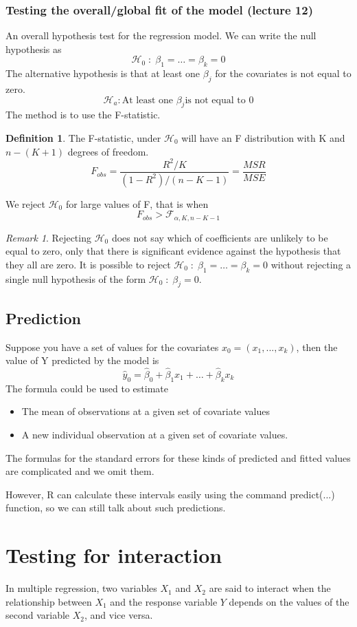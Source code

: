 \documentclass[12pt]{article}
\theoremstyle{definition}
\newtheorem{definition}{Definition}[section]
\theoremstyle{remark}
\newtheorem*{remark}{Remark}
\begin{document}
\subsubsection{Testing the overall/global fit of the model (lecture 12)}
    An overall hypothesis test for the regression model.
    We can write the null hypothesis as $$\mathcal{H}_0 \;:\; \beta_1 =\hdots=\beta_k =0$$
    The alternative hypothesis is that at least one $\beta_j$ for the covariates is not
    equal to zero.
    $$\mathcal{H}_a : \text{At least one } \beta_j \text{is not equal to }0$$
    The method is to use the F-statistic. 
    \begin{definition}
        The F-statistic, under $\mathcal{H}_0$ will have an F distribution with K and $n-(K + 1)$ degrees of freedom.
            $$F_{obs} = \frac{R^2/K}{(1-R^2)/(n-K-1)} = \frac{MSR}{MSE}$$
    \end{definition}
    We reject $\mathcal{H}_0$ for large values of F, that is when 
    $$F_{obs}>\mathcal{F}_{\alpha, K, n-K-1}$$
    \begin{remark}
        Rejecting $\mathcal{H}_0$ does not say which of coefficients are unlikely to be equal to zero, only that there is significant evidence against the hypothesis that they all are zero.
        It is possible to reject $\mathcal{H}_0 \; : \;\beta_1 =\hdots = \beta_k= 0$ without rejecting a single null hypothesis of the form $\mathcal{H}_0 \; :\; \beta_j = 0$.
    \end{remark}
\subsection{Prediction}
    Suppose you have a set of values for the covariates $x_0 =(x_1,...,x_k)$, then the value of Y predicted by the model is
    $$\hat{y}_0 = \hat{\beta}_0 + \hat{\beta}_1x_1 +\hdots + \hat{\beta}_kx_k $$
    The formula could be used to estimate 
    \begin{itemize}
        \item The mean of observations at a given set of covariate values
        \item A new individual observation at a given set of covariate values.
    \end{itemize}
The formulas for the standard errors for these kinds of predicted and fitted values are complicated and we omit them.

However, R can calculate these intervals easily using the command predict(...) function, so we can still talk about such predictions.
\section{Testing for interaction}
In multiple regression, two variables $X_1$ and $X_2$ are said to interact when the relationship between $X_1$ and the response variable $Y$ depends on the values of the second variable $X_2$, and vice versa.
\end{document}
